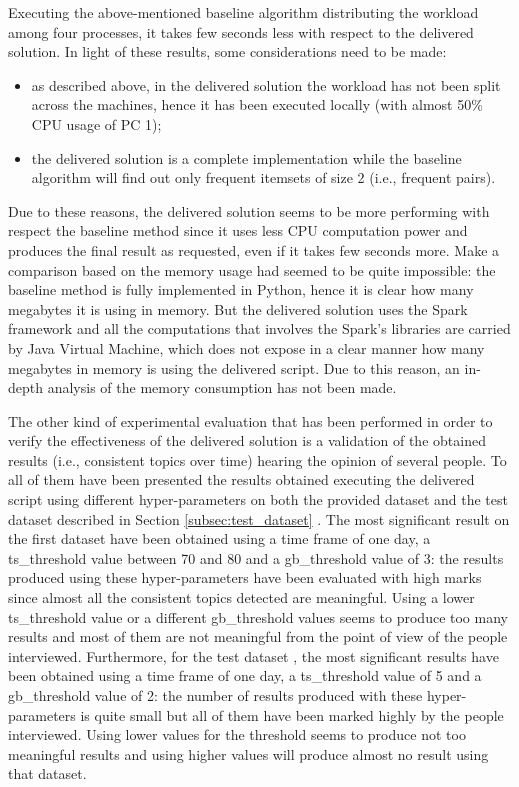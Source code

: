 Executing the above-mentioned baseline algorithm distributing the workload among four processes, it takes few seconds less with respect to the delivered solution. In light of these results, some considerations need to be made:
\begin{itemize}
	\item as described above, in the delivered solution the workload has not been split across the machines, hence it has been executed locally (with almost 50\% CPU usage of PC 1);
	\item the delivered solution is a complete implementation while the baseline algorithm will find out only frequent itemsets of size 2 (i.e., frequent pairs).
\end{itemize}
Due to these reasons, the delivered solution seems to be more performing with respect the baseline method since it uses less CPU computation power and produces the final result as requested, even if it takes few seconds more. Make a comparison based on the memory usage had seemed to be quite impossible: the baseline method is fully implemented in Python, hence it is clear how many megabytes it is using in memory. But the delivered solution uses the Spark framework and all the computations that involves the Spark's libraries are carried by Java Virtual Machine, which does not expose in a clear manner how many megabytes in memory is using the delivered script. Due to this reason, an in-depth analysis of the memory consumption has not been made.

The other kind of experimental evaluation that has been performed in order to verify the effectiveness of the delivered solution is a validation of the obtained results (i.e., consistent topics over time) hearing the opinion of several people. To all of them have been presented the results obtained executing the delivered script using different hyper-parameters on both the provided dataset \cite{covid19-tweets-dataset} and the test dataset described in Section \ref{subsec:test_dataset} \cite{sentiment-analysis-dataset}. The most significant result on the first dataset have been obtained using a time frame of one day, a ts\_threshold value between 70 and 80 and a gb\_threshold value of 3: the results produced using these hyper-parameters have been evaluated with high marks since almost all the consistent topics detected are meaningful. Using a lower ts\_threshold value or a different gb\_threshold values seems to produce too many results and most of them are not meaningful from the point of view of the people interviewed. Furthermore, for the test dataset \cite{sentiment-analysis-dataset}, the most significant results have been obtained using a time frame of one day, a ts\_threshold value of 5 and a gb\_threshold value of 2: the number of results produced with these hyper-parameters is quite small but all of them have been marked highly by the people interviewed. Using lower values for the threshold seems to produce not too meaningful results and using higher values will produce almost no result using that dataset.

